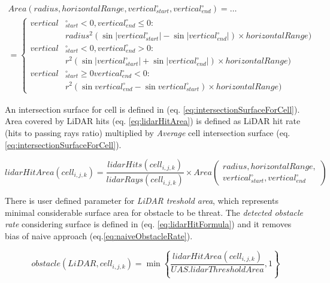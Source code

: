 \begin{multline}\label{eq:intersectionSurfaceForCell}
    Area(radius,horizontal Range, vertical_{start}^\circ, vertical_{end}^\circ) =\dots\\ 
    =\left\{
    \begin{aligned}
        vertical&_{start}^\circ <0, vertical_{end}^\circ \le 0 :\\ 
            &radius^2(\sin |vertical_{start}^\circ| - \sin|vertical_{end}^\circ|)\times horizontal Range)\\
         vertical&_{start}^\circ <0, vertical_{end}^\circ > 0   :\\
            & r^2(\sin |vertical_{start}^\circ| + \sin|vertical_{end}^\circ|)\times horizontal Range)\\
         vertical&_{start}^\circ \ge 0 vertical_{end}^\circ < 0 :\\
            & r^2(\sin vertical_{end}^\circ- \sin vertical_{start}^\circ)\times horizontal Range)
    \end{aligned}
    \right.
\end{multline}

\noindent An intersection surface for cell is defined in (eq. \ref{eq:intersectionSurfaceForCell}). Area covered by LiDAR hits (eq. \ref{eq:lidarHitArea}) is defined as LiDAR hit rate (hits to passing rays ratio) multiplied by \emph{Average} cell intersection surface (eq. \ref{eq:intersectionSurfaceForCell}).

\begin{equation}\label{eq:lidarHitArea}
    lidar Hit Area(cell_{i,j,k}) = \frac{lidar Hits(cell_{i,j,k})}{lidar Rays(cell_{i,j,k})} \times Area\left(\begin{gathered}radius,horizontal Range,\\ vertical_{start}^\circ, vertical_{end}^\circ\end{gathered}\right)
\end{equation}

\noindent There is user defined parameter for \emph{LiDAR treshold area}, which represents minimal considerable surface area for obstacle to be threat. The \emph{detected obstacle rate} considering surface is defined in (eq. \ref{eq:lidarHitFormula}) and it removes bias of naive approach (eq.\ref{eq:naiveObstacleRate}).

\begin{equation}\label{eq:lidarHitFormula}
    obstacle(LiDAR,cell_{i,j,k})=\min\left\{\frac{lidar Hit Area(cell_{i,j,k})}{UAS.lidar Threshold Area},1\right\}
\end{equation}

